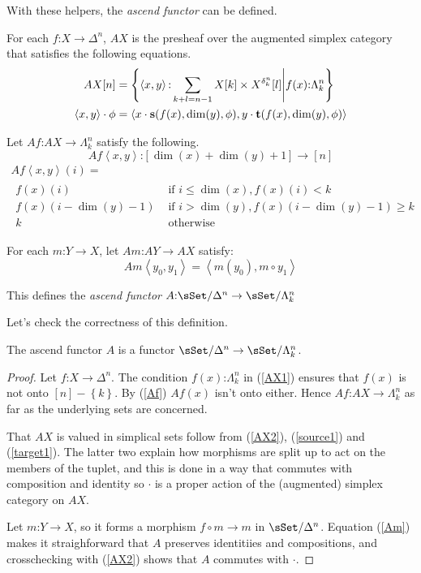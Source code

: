 \documentclass{tac}
\newcommand\of{\mathord:}
\newcommand\set[1]{\left\{#1\right\}}
\newcommand\tuplet[1]{\left\langle{} #1 \right\rangle}
\newcommand\simplex[1]{\Delta^{#1}}
\newcommand\horn[2]{\Lambda^{#1}_{#2}}
\begin{document}
With these helpers, the \emph{ascend functor} can be defined.
\begin{definition}
  For each \( f\of X\to \simplex{n} \), \( AX \) is the 
  presheaf over the augmented simplex category that
  satisfies the following equations.
  \begin{align} 
    \label{AX1} AX[n] &= \set{
      \tuplet{x,y}\of\sum_{k+l=n-1} X[k]\times X^{\delta^n_k}[l]
    \middle|
      f(x)\of \horn{n}{k}
    }\\
    \label{AX2} \tuplet{x,y}\cdot\phi &= \tuplet{
      x\cdot\source(f(x),\dim(y),\phi),
      y\cdot\target(f(x),\dim(y),\phi)
    }
  \end{align}

  Let \( Af\of AX\to \horn{n}{k} \) satisfy the following.
  \[Af\tuplet{x,y}\of[\dim(x)+\dim(y)+1]\to[n]\]
  \begin{multline}
    \label{Af} Af\tuplet{x,y}(i) = \\
    \begin{array}{rl}
      f(x)(i) &
      \textrm{ if } i\leq\dim(x), f(x)(i)<k \\
      f(x)(i-\dim(y)-1) &
      \textrm{ if } i > \dim(y), f(x)(i-\dim(y)-1)\geq k\\
      k &
      \textrm{ otherwise}
    \end{array}
  \end{multline}
  
  For each \( m\of Y\to X \), let \( Am\of AY \to AX \) satisfy: 
  \begin{equation} \label{Am}
    Am\tuplet{y_0,y_1} = \tuplet{m(y_0),m\circ y_1}
  \end{equation}

  This defines the \emph{ascend functor} \(
    A\of \sSet/\simplex{n} \to \sSet/\horn{n}{k}
  \)
\end{definition}

Let's check the correctness of this definition.

\begin{lemma} The ascend functor \(A\) is a functor 
\(\sSet/\simplex{n} \to \sSet/\horn{n}{k}\). \end{lemma}

\begin{proof} 
  Let \(f\of X\to \simplex{n} \). The condition
  \(f(x)\of\horn{n}{k}\) in (\ref{AX1}) ensures that 
  \(f(x)\) is not onto \([n]-\set{k}\). By 
  (\ref{Af}) \(Af(x)\) isn't onto either. Hence
  \(Af\of AX\to \horn{n}{k} \) as far as the underlying sets are
  concerned.

  That \(AX\) is valued in simplical sets follow from (\ref{AX2}),
  (\ref{source1}) and (\ref{target1}). The latter two explain how
  morphisms are split up to act on the members of the tuplet,
  and this is done in a way that commutes with composition and
  identity so \(\cdot \) is a proper action of the (augmented)
  simplex category on \(AX\).

  Let \(m\of Y \to X\), so it forms a morphism 
  \(f\circ m \to m\) in \(\sSet/\simplex{n}\). Equation
  (\ref{Am}) makes it straighforward that \(A\) preserves
  identitiies and compositions, and crosschecking with 
  (\ref{AX2}) shows that \(A\) commutes with \(\cdot \).
\end{proof}
\end{document}
